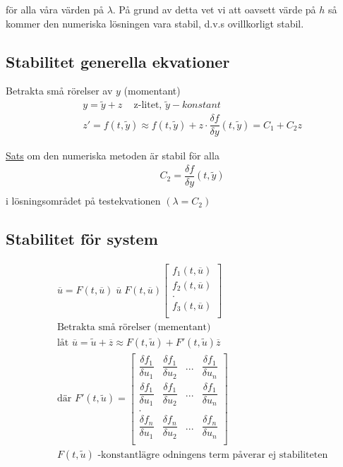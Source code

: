 \documentclass{article}
\begin{document}
för alla våra värden på $\lambda$. På grund av detta vet vi att oavsett värde på $h$ så kommer den numeriska lösningen vara stabil, d.v.s ovillkorligt stabil.


\newpage
\subsection{Stabilitet generella ekvationer}
Betrakta små rörelser av $y$ (momentant)
\begin{align*}
  &\quad  y=\tilde{y}+z \;\;\; \text{  z-litet, $\tilde{y}-konstant$} \\
  &\quad  z'=f(t,\tilde{y}) \approx f(t,\tilde{y})+z\cdot\dfrac{\delta f}{\delta y}(t,\tilde{y}) = C_1+C_2z
\end{align*}

\underline{Sats} om den numeriska metoden är stabil för alla 
\begin{align*}
  &\quad  C_2=\dfrac{\delta f}{\delta y}(t,\tilde{y}) \\
\end{align*}
i lösningsområdet på testekvationen $(\lambda=C_2)$

\subsection{Stabilitet för system}
\begin{align*}
  &\quad  \overline{u} = F(t,\overline{u}) \; \overline{u} \; F(t,\overline{u})
  \begin{bmatrix}
    f_1(t,\overline{u})\\
    f_2(t,\overline{u})\\
    .\\
    f_3(t,\overline{u})\\
  \end{bmatrix}\\
  &\quad  \text{Betrakta små rörelser (mementant)} \\
  &\quad  \text{låt } \overline{u}=\tilde{u}+\overline{z} \approx F(t,\tilde{u})+F'(t,\tilde{u})\overline{z} \\
  &\quad  \text{där } F'(t,\tilde{u})=
  \begin{bmatrix}
    \dfrac{\delta f_1}{\delta u_1} & \dfrac{\delta f_1}{\delta u_2} & ... & \dfrac{\delta f_1}{\delta u_n} \\
    \dfrac{\delta f_1}{\delta u_1} & \dfrac{\delta f_1}{\delta u_2} & ... & \dfrac{\delta f_1}{\delta u_n} \\
    . & & & \\
    \dfrac{\delta f_n}{\delta u_1} & \dfrac{\delta f_n}{\delta u_2} & ... & \dfrac{\delta f_n}{\delta u_n} \\
  \end{bmatrix}\\
  &\quad F(t,\tilde{u}) \text{ -konstantlägre odningens term påverar ej stabiliteten}\\
\end{align*}
\end{document}
